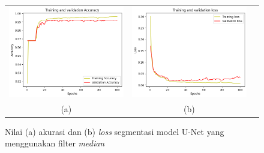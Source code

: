 \begin{enumerate}
	
	\begin{figure}[htbp]
		\centering
		\begin{tabular}{ccc}
			\includegraphics[scale=0.5]{bab4/acc-median-unet.png} & 
			\includegraphics[scale=0.5]{bab4/loss-median-unet.png} & \\
			(a) & (b)    %
		\end{tabular}
		\caption{Nilai (a) akurasi dan (b) \textit{loss} segmentasi model U-Net yang menggunakan filter \textit{median}}
		\label{fig:performance-median-unet}
	\end{figure}
	

\end{enumerate}
